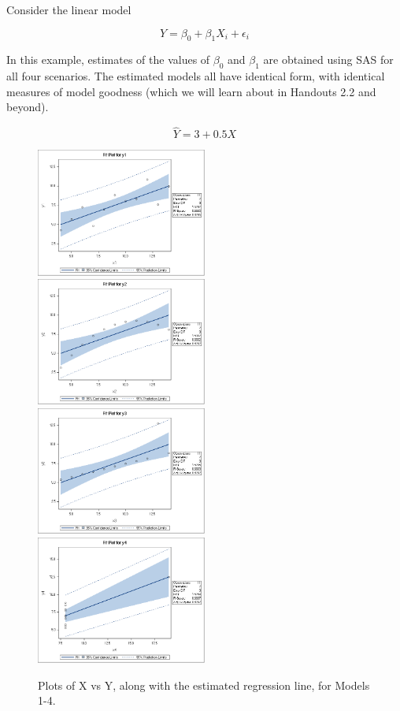 \documentclass[12pt]{../notes}
\begin{document}

Consider the linear model 

\[Y = \beta_0 + \beta_1X_i + \epsilon_i\]

In this example, estimates of the values of $\beta_0$ and $\beta_1$ are obtained using SAS for all four scenarios. The estimated models all have identical form, with identical measures of model goodness (which we will learn about in Handouts 2.2 and beyond). 

\[\hat{Y} = 3 + 0.5X\]



\begin{figure}[H]
\includegraphics[width = 0.5\textwidth]{../figures/module1/fit1.png}
\includegraphics[width = 0.5\textwidth]{../figures/module1/fit2.png}
\includegraphics[width = 0.5\textwidth]{../figures/module1/fit3.png}
\includegraphics[width = 0.5\textwidth]{../figures/module1/fit4.png}
\caption{Plots of X vs Y, along with the estimated regression line, for Models 1-4.}
\label{fitplots}
\end{figure}
\end{document}
